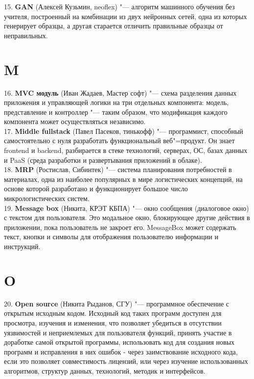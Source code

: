 \documentclass[14 pt]{extarticle}
\begin{document}
    15. \textbf{GAN} (Алексей Кузьмин, neoflex) "--- алгоритм машинного обучения без учителя, построенный на комбинации из двух нейронных сетей, одна из которых генерирует образцы, а другая старается отличить правильные образцы от неправильных.
    
\section*{M}
    16. \textbf{MVC модуль} (Иван Жадаев, Мастер софт) "--- схема разделения данных приложения и управляющей логики на три отдельных компонента: модель, представление и контроллер "--- таким образом, что модификация каждого компонента может осуществляться независимо. \\
    
    17. \textbf{Middle fullstack} (Павел Пасеков, тинькофф) "--- программист, способный самостоятельно с нуля разработать функциональный веб"=продукт. Он знает frontend и backend, разбирается в стеке технологий, серверах, ОС, базах данных и PaaS (среда разработки и развертывания приложений в облаке). \\
    
    18. \textbf{MRP} (Ростислав, Сибинтек) "--- система планирования потребностей в материалах, одна из наиболее популярных в мире логистических концепций, на основе которой разработано и функционирует большое число микрологистических систем. \\
    
    19. \textbf{Message box} (Никита, КРЭТ КБПА) "--- окно сообщения (диалоговое окно) с текстом для пользователя. Это модальное окно, блокирующее другие действия в приложении, пока пользователь не закроет его. MessageBox может содержать текст, кнопки и символы для отображения пользователю информации и инструкций. \\
    
\section*{O}
    20. \textbf{Open source} (Никита Рыданов, СГУ) "--- программное обеспечение с открытым исходным кодом. Исходный код таких программ доступен для просмотра, изучения и изменения, что позволяет убедиться в отсутствии уязвимостей и неприемлемых для пользователя функций, принять участие в доработке самой открытой программы, использовать код для создания новых программ и исправления в них ошибок - через заимствование исходного кода, если это позволяет совместимость лицензий, или через изучение использованных алгоритмов, структур данных, технологий, методик и интерфейсов. \\
    
\end{document}

